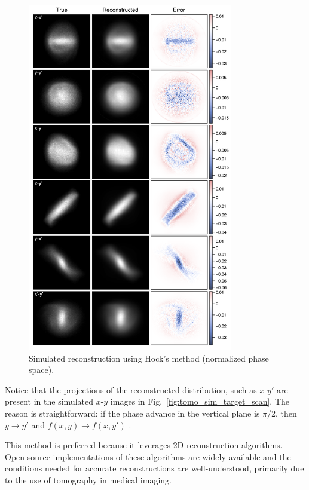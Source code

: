 \begin{figure}[!p]
    \centering
    \includegraphics[width=0.8\textwidth]{Images/chapter4/tomo_sim_rec_hock_proj_2D_ver.png}
    \caption{Simulated reconstruction using Hock's method (normalized phase space).}
    \label{fig:tomo_sim_rec_hock_proj_2D}
\end{figure}
%
Notice that the projections of the reconstructed distribution, such as $x$-$y'$ are present in the simulated $x$-$y$ images in Fig.~\ref{fig:tomo_sim_target_scan}. The reason is straightforward: if the phase advance in the vertical plane is $\pi$/2, then $y \rightarrow y'$ and $f(x, y) \rightarrow f(x, y')$ \cite{Hock2013a}.

This method is preferred because it leverages 2D reconstruction algorithms. Open-source implementations of these algorithms are widely available and the conditions needed for accurate reconstructions are well-understood, primarily due to the use of tomography in medical imaging. 


